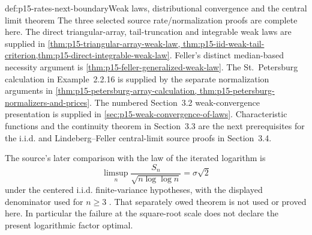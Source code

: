 \begin{proofboundary}{def:p15-rates-next-boundary}{Weak laws, distributional convergence and the central limit theorem}
The three selected source rate/normalization proofs are complete here.
The direct triangular-array, tail-truncation and integrable weak laws
are supplied in \cref{thm:p15-triangular-array-weak-law,
thm:p15-iid-weak-tail-criterion,thm:p15-direct-integrable-weak-law}.
Feller's distinct median-based necessity argument is
\cref{thm:p15-feller-generalized-weak-law}.
The St.~Petersburg calculation in Example~2.2.16 is supplied by the
separate normalization arguments in
\cref{thm:p15-petersburg-array-calculation,
thm:p15-petersburg-normalizers-and-prices}.
The numbered Section~3.2 weak-convergence presentation is supplied in
\cref{sec:p15-weak-convergence-of-laws}.
Characteristic functions and the continuity theorem in Section~3.3
are the next prerequisites for the i.i.d. and Lindeberg--Feller
central-limit source proofs in Section~3.4.

The source's later comparison with the law of the iterated logarithm is
\[
 \limsup_n\frac{S_n}{\sqrt{n\log\log n}}=\sigma\sqrt2
\]
under the centered i.i.d. finite-variance hypotheses, with the displayed
denominator used for \(n\geq3\)
\cite[p.~87; Theorem~8.5.2]{DurrettPTEAuthor2019}. That separately
owed theorem is not used or proved here. In particular the failure
at the square-root scale does not declare the present logarithmic
factor optimal.
\end{proofboundary}
